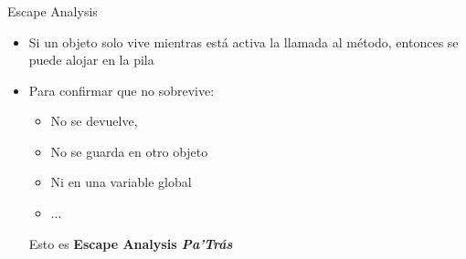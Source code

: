 \begin{frame}[fragile]
  \frametitle{\ft}
  \begin{block}{Escape Analysis}
    \begin{itemize}
    \item Si un objeto solo vive mientras está activa la llamada al método,
      entonces se puede alojar en la pila
    \item Para confirmar que no sobrevive:
      \begin{itemize}
      \item No se devuelve,
      \item No se guarda en otro objeto
      \item Ni en una variable global
      \item ...
      \end{itemize}
      Esto es {\bfseries Escape Analysis {\it Pa'Trás}}
    \end{itemize}
  \end{block}
\end{frame}

